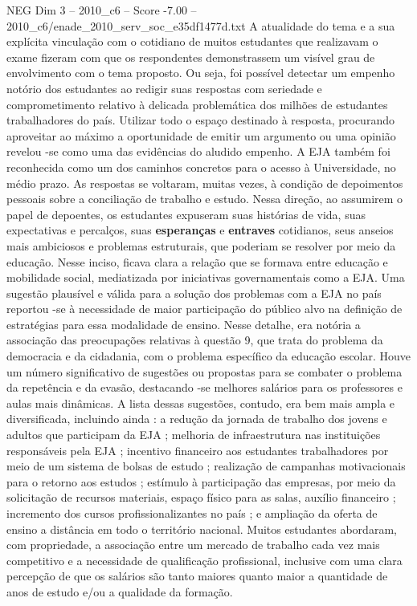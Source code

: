\begin{textsample}{NEG Dim 3 – 2010\_c6 – Score -7.00 – 2010\_c6/enade\_2010\_serv\_soc\_e35df1477d.txt}
A atualidade do tema e a sua explícita vinculação com o cotidiano de muitos estudantes que realizavam o exame fizeram com que os respondentes demonstrassem um visível grau de envolvimento com o tema proposto.
Ou seja, foi possível detectar um empenho notório dos estudantes ao redigir suas respostas com seriedade e comprometimento relativo à delicada problemática dos milhões de estudantes trabalhadores do país.
Utilizar todo o espaço destinado à resposta, procurando aproveitar ao máximo a oportunidade de emitir um argumento ou uma opinião revelou -se como uma das evidências do aludido empenho.
A EJA também foi reconhecida como um dos caminhos concretos para o acesso à Universidade, no médio prazo.
As respostas se voltaram, muitas vezes, à condição de depoimentos pessoais sobre a conciliação de trabalho e estudo.
Nessa direção, ao assumirem o papel de depoentes, os estudantes expuseram suas histórias de vida, suas expectativas e percalços, suas \textbf{esperanças} e \textbf{entraves} cotidianos, seus anseios mais ambiciosos e problemas estruturais, que poderiam se resolver por meio da educação.
Nesse inciso, ficava clara a relação que se formava entre educação e mobilidade social, mediatizada por iniciativas governamentais como a EJA.
Uma sugestão plausível e válida para a solução dos problemas com a EJA no país reportou -se à necessidade de maior participação do público alvo na definição de estratégias para essa modalidade de ensino.
Nesse detalhe, era notória a associação das preocupações relativas à questão 9, que trata do problema da democracia e da cidadania, com o problema específico da educação escolar.
Houve um número significativo de sugestões ou propostas para se combater o problema da repetência e da evasão, destacando -se melhores salários para os professores e aulas mais dinâmicas.
A lista dessas sugestões, contudo, era bem mais ampla e diversificada, incluindo ainda : a redução da jornada de trabalho dos jovens e adultos que participam da EJA ; melhoria de infraestrutura nas instituições responsáveis pela EJA ; incentivo financeiro aos estudantes trabalhadores por meio de um sistema de bolsas de estudo ; realização de campanhas motivacionais para o retorno aos estudos ; estímulo à participação das empresas, por meio da solicitação de recursos materiais, espaço físico para as salas, auxílio financeiro ; incremento dos cursos profissionalizantes no país ; e ampliação da oferta de ensino a distância em todo o território nacional.
Muitos estudantes abordaram, com propriedade, a associação entre um mercado de trabalho cada vez mais competitivo e a necessidade de qualificação profissional, inclusive com uma clara percepção de que os salários são tanto maiores quanto maior a quantidade de anos de estudo e/ou a qualidade da formação.

\end{textsample}
